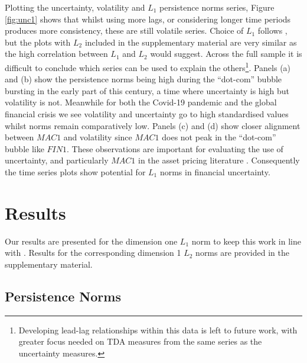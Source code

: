 \documentclass{article}
\begin{document}
Plotting the uncertainty, volatility and $L_1$ persistence norms series, Figure \ref{fig:unc1} shows that whilst using more lags, or considering longer time periods produces more consistency, these are still volatile series. Choice of $L_1$ follows \cite{gidea2018topological}, but the plots with $L_2$ included in the supplementary material are very similar as the high correlation between $L_1$ and $L_2$ would suggest. Across the full sample it is difficult to conclude which series can be used to explain the others\footnote{Developing lead-lag relationships within this data is left to future work, with greater focus needed on TDA measures from the same series as the uncertainty measures.}. Panels (a) and (b) show the persistence norms being high during the ``dot-com'' bubble bursting in the early part of this century, a time where uncertainty is high but volatility is not. Meanwhile for both the Covid-19 pandemic and the global financial crisis we see volatility and uncertainty go to high standardised values whilst norms remain comparatively low. Panels (c) and (d) show closer alignment between $MAC1$ and volatility since $MAC1$ does not peak in the ``dot-com'' bubble like $FIN1$. These observations are important for evaluating the use of uncertainty, and particularly $MAC1$ in the asset pricing literature \citep{bali2017economic,bali2021macroeconomic}. Consequently the time series plots show potential for $L_1$ norms in financial uncertainty. 

\section{Results}

Our results are presented for the dimension one $L_1$ norm to keep this work in line with \cite{gidea2018topological}. Results for the corresponding dimension 1 $L_2$ norms are provided in the supplementary material.

\subsection{Persistence Norms}
\end{document}
